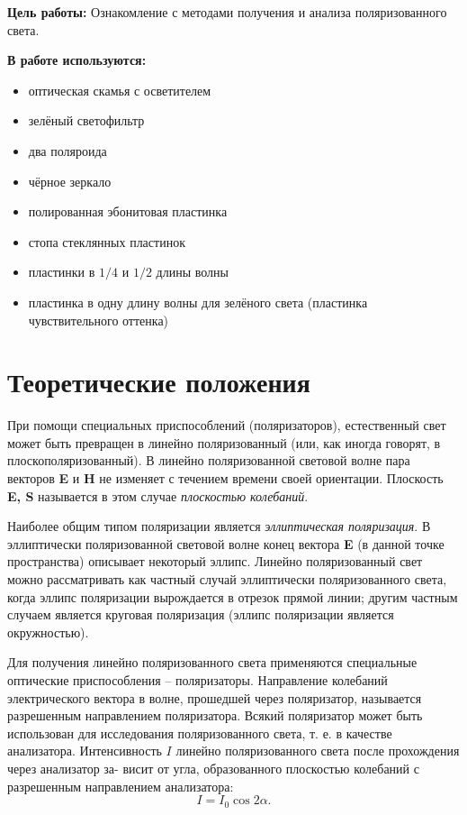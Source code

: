 


	
	
	\textbf{Цель работы:} Ознакомление с методами получения и анализа поляризованного света.
	
	\textbf{В работе используются:}
	\begin{itemize}
		\item оптическая скамья с осветителем
		\item зелёный светофильтр
		\item два поляроида
		\item чёрное зеркало
		\item полированная эбонитовая пластинка
		\item стопа стеклянных пластинок
		\item пластинки в $1/4$ и $1/2$ длины волны
		\item пластинка в одну длину волны для зелёного света (пластинка чувствительного оттенка)
	\end{itemize}
	
	\section*{Теоретические положения}
	
	При помощи специальных приспособлений (поляризаторов), естественный свет может быть превращен в линейно поляризованный (или, как иногда говорят, в плоскополяризованный). В линейно поляризованной световой волне пара векторов \textbf{E} и \textbf{H} не изменяет с течением времени своей ориентации. Плоскость \textbf{E, S} называется в этом случае \textit{плоскостью колебаний}.
	
	Наиболее общим типом поляризации является \textit{эллиптическая поляризация}. В эллиптически поляризованной световой волне конец вектора
	\textbf{E} (в данной точке пространства) описывает некоторый эллипс. Линейно
	поляризованный свет можно рассматривать как частный случай эллиптически поляризованного света, когда эллипс поляризации вырождается в отрезок прямой линии; другим частным случаем является круговая поляризация (эллипс поляризации является окружностью).
	
	Для получения линейно поляризованного света применяются специальные оптические приспособления -- поляризаторы. Направление колебаний электрического вектора в волне, прошедшей через поляризатор, называется разрешенным направлением поляризатора. Всякий поляризатор может быть использован для исследования поляризованного света, т. е. в качестве анализатора. Интенсивность $I$ линейно поляризованного света после прохождения через анализатор за-
	висит от угла, образованного плоскостью колебаний с разрешенным направлением анализатора:
	\begin{equation} \label{eq:Malus}
	I = I_0 \cos 2\alpha.  
	\end{equation}
	
